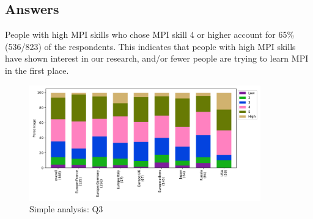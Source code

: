 
\subsection{Answers}


People with high MPI skills who chose MPI skill 4 or higher 
account for 65\% (536/823) of the respondents. This 
indicates that people with high MPI skills have shown 
interest in our research, and/or fewer people are trying 
to learn MPI in the first place.

\begin{figure}[htb]
\begin{center}
\includegraphics[width=10cm]{../pdfs/Q3.pdf}
\caption{Simple analysis: Q3}
\label{fig:Q3}
\end{center}
\end{figure}
